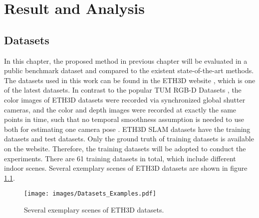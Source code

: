 \chapter{Result and Analysis}
\label{cha:result}

\section{Datasets}
\label{sec:Test_Datasets}
In this chapter, the proposed method in previous chapter will be evaluated in a public benchmark dataset and compared to the existent state-of-the-art methods. The datasets used in this work can be found in the ETH3D website \parencite{website:ETH3D}, which is one of the latest datasets. In contrast to the popular TUM RGB-D Datasets \parencite{6385773}, the color images of ETH3D datasets were recorded via synchronized global shutter cameras, and the color and depth images were recorded at exactly the same points in time, such that no temporal smoothness assumption is needed to use both for estimating one camera pose \parencite{8954208}. ETH3D SLAM datasets have the training datasets and test datasets. Only the ground truth of training datasets is available on the website. Therefore, the training datasets will be adopted to conduct the experiments. There are 61 training datasets in total, which include different indoor scenes. Several exemplary scenes of ETH3D datasets are shown in figure \ref{Datasets_Examples}.
\begin{figure}[thb]
    \centering
    \texttt{[image: images/Datasets\_Examples.pdf]}
    \caption[Several exemplary scenes of ETH3D datasets]{Several exemplary scenes of ETH3D datasets.}\label{Datasets_Examples}
\end{figure}


